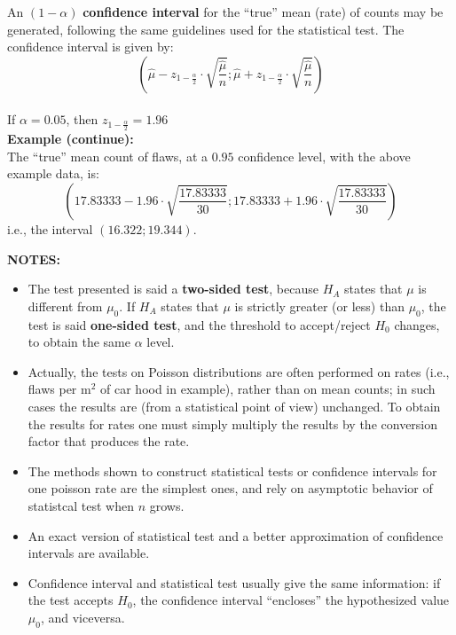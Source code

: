 \begin{frame}
  An $(1-\alpha)$ \textbf{confidence interval} for the ``true'' mean (rate) of counts may be generated, following the same guidelines used for the statistical test. The confidence interval is given by:
  $$ \left( \hat{\mu} - z_{1-\frac{\alpha}{2}} \cdot \sqrt{\frac{\hat{\mu}}{n}}; \hat{\mu} + z_{1-\frac{\alpha}{2}} \cdot \sqrt{\frac{\hat{\mu}}{n}} \right) $$\\
  If $\alpha=0.05$, then $z_{1-\frac{\alpha}{2}}=1.96$\\
  \textbf{Example (continue):}\\
  The ``true'' mean count of flaws, at a $ 0.95 $ confidence level, with the above example data, is:
  $$ \left( 17.83333 - 1.96 \cdot \sqrt{\frac{17.83333}{30}}; 17.83333 + 1.96 \cdot \sqrt{\frac{17.83333}{30}} \right) $$
  i.e., the interval $ \left(16.322; 19.344\right) $.
\end{frame}

\begin{frame}
  \vspace{0.25cm}
  \textbf{NOTES:} 
  \begin{itemize}
    \vspace{0.25cm}
    \item The test presented is said a \textbf{two-sided test}, because $H_A$ states that $\mu$ is different from $\mu_0$. If $H_A$ states that $\mu$ is strictly greater (or less) than $\mu_0$, the test is said \textbf{one-sided test}, and the threshold to accept/reject $H_0$ changes, to obtain the same $\alpha$ level.
    \vspace{0.5cm}
    \item Actually, the tests on Poisson distributions are often performed on rates (i.e., flaws per m$^2$ of car hood in example), rather than on mean counts; in such cases the results are (from a statistical point of view) unchanged. To obtain the results for rates one must simply multiply the results by the conversion factor that produces the rate.
  \end{itemize}
\end{frame}


\begin{frame}
  \begin{itemize}
    \vspace{0.25cm}
    \item The methods shown to construct statistical tests or confidence intervals for one poisson rate are the simplest ones, and rely on asymptotic behavior of statistcal test when $n$ grows.\\
    \vspace{0.5cm}
    \item An exact version of statistical test and a better approximation of confidence intervals are available.
    \vspace{0.5cm}
    \item Confidence interval and statistical test usually give the same information: if the test accepts $H_0$, the confidence interval ``encloses'' the hypothesized value $\mu_0$, and viceversa.
  \end{itemize}
\end{frame}

